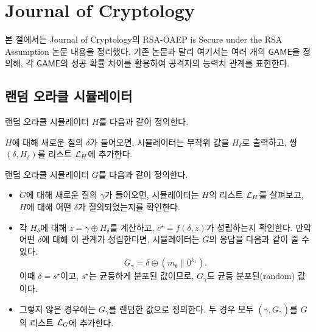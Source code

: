 
\section{Journal of Cryptology}

\newcommand{\game}{\textsf{GAME}}
\newcommand{\pe}{\mathcal{PE}}
\newcommand{\glist}{\mathcal{L}_{G}}
\newcommand{\hlist}{\mathcal{L}_{H}}

본 절에서는 Journal of Cryptology의 RSA-OAEP is Secure under the RSA Assumption
논문 내용을 정리했다. 기존 논문과 달리 여기서는 여러 개의 $\game$을 정의해, 각
$\game$의 성공 확률 차이를 활용하여 공격자의 능력치 관계를 표현한다.


\subsection{랜덤 오라클 시뮬레이터}

랜덤 오라클 시뮬레이터 $H$를 다음과 같이 정의한다.

\begin{tcolorbox}
	$H$에 대해 새로운 질의 $\delta$가 들어오면, 시뮬레이터는 무작위 값을 $H_\delta$로
	출력하고, 쌍 $(\delta, H_\delta)$를 리스트 $\mathcal{L}_H$에 추가한다.
\end{tcolorbox}

랜덤 오라클 시뮬레이터 $G$를 다음과 같이 정의한다.

\begin{tcolorbox}
	\begin{itemize}
		\item $G$에 대해 새로운 질의 $\gamma$가 들어오면, 시뮬레이터는 $H$의 리스트
		$\mathcal{L}_H$를 살펴보고, $H$에 대해 어떤 $\delta$가 질의되었는지를 확인한다. 
		\item 각 $H_\delta$에 대해 $z = \gamma \oplus H_\delta$를 계산하고,
		$c^\star = f(\delta, z)$가 성립하는지 확인한다. 만약 어떤 $\delta$에
		대해 이 관계가 성립한다면, 시뮬레이터는 $G$의 응답을 다음과 같이 줄 수
		있다. 
		$$
			G_\gamma = \delta \oplus (m_b \parallel 0^{k_1}).
		$$
		이때 $\delta = s^\star$이고, $s^\star$는 균등하게 분포된 값이므로,
		$G_\gamma$도 균등 분포된(random) 값이다. 
		\item 그렇지 않은 경우에는 $G_\gamma$를 랜덤한 값으로 정의한다. 두 경우
		모두 $(\gamma, G_\gamma)$를 $G$의 리스트 $\mathcal{L}_G$에 추가한다.
	\end{itemize}
\end{tcolorbox}

